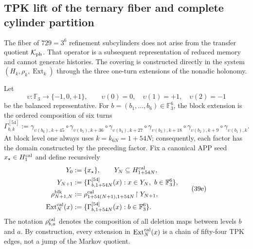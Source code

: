 \subsection{TPK lift of the ternary fiber and complete cylinder partition}
\label{subsec:elevacion-catalogal-ch}

The fiber of \(729=3^6\) refinement subcylinders does not arise from the transfer quotient
\(\mathcal K_{\rm ph}\). That operator is a subsequent representation of reduced
memory and cannot generate histories. The covering is constructed directly
in the system \((H_k,\rho_k,\operatorname{Ext}_k)\) through the three
one-turn extensions of the nonadic holonomy.





Let
\[
 \upsilon:\mathbb F_3\longrightarrow\{-1,0,+1\},\qquad
 \upsilon(0)=0,\quad\upsilon(1)=+1,\quad\upsilon(2)=-1
\]
be the balanced representative. For
\(b=(b_1,\ldots,b_6)\in\mathbb F_3^6\), the block extension is the
ordered composition of six turns
\[
 \Gamma_{b,k}^{[54]}:=
 \gamma_{\upsilon(b_6),k+45}\circ\gamma_{\upsilon(b_5),k+36}\circ
 \gamma_{\upsilon(b_4),k+27}\circ\gamma_{\upsilon(b_3),k+18}\circ
 \gamma_{\upsilon(b_2),k+9}\circ\gamma_{\upsilon(b_1),k}.
\tag{39d}
\label{eq:gamma-bloque-54-ch}
\]
At block level one always uses
\(k=k_{6N}=1+54N\); consequently, each factor has the domain constructed by
the preceding factor.
Fix a canonical APP seed \(x_\star\in H^{\rm cal}_1\) and define recursively
\[
 \begin{aligned}
  Y_0&:=\{x_\star\},\qquad Y_N\subseteq H_{1+54N}^{\rm cal},\\
  Y_{N+1}&:=\{\Gamma_{b,1+54N}^{[54]}(x):
                 x\in Y_N,\ b\in\mathbb F_3^6\},\\
  \rho^{\rm blk}_{N+1,N}
    &:=\rho^{\rm cal}_{1+54(N+1),1+54N}
       \!\upharpoonright Y_{N+1},\\
  \operatorname{Ext}^{\rm cal}_N(x)
    &:=\{\Gamma_{b,1+54N}^{[54]}(x):b\in\mathbb F_3^6\}.
 \end{aligned}
\tag{39e}
\label{eq:sincronizacion-54-ch}
\]
The notation \(\rho^{\rm cal}_{b,a}\) denotes the composition of all deletion maps
between levels \(b\) and \(a\). By construction, every extension in
\(\operatorname{Ext}^{\rm cal}_N(x)\) is a chain of fifty-four
TPK edges, not a jump of the Markov quotient.

